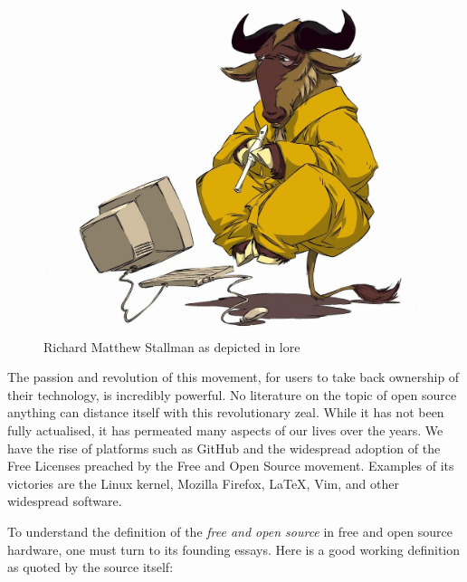 \documentclass{article}
\begin{document}
\begin{figure}[h]
    \centering
    \includegraphics[width=\textwidth]{the_wise_gnu.jpg}
    \caption{Richard Matthew Stallman as depicted in lore}
    \label{fig:rms}
\end{figure}

The passion and revolution of this movement, for users to take back ownership of their technology, is incredibly powerful. 
No literature on the topic of open source anything can distance itself with this revolutionary zeal. 
While it has not been fully actualised, it has permeated many aspects of our lives over the years.
We have the rise of platforms such as GitHub and the widespread adoption of the Free Licenses preached by the Free and Open Source movement. 
Examples of its victories are the Linux kernel, Mozilla Firefox, \LaTeX, Vim, and other widespread software. 

To understand the definition of the \textit{free and open source} in free and open source hardware, one must turn to its founding essays. Here is a good working definition as quoted by the source itself:
\end{document}
